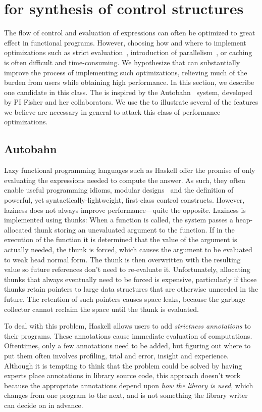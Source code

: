 \section{\rasps for synthesis of control structures}

The flow of control and evaluation of expressions can often be
optimized to great effect in functional programs.  However, choosing
how and where to implement optimizations such as strict
evaluation~\cite{autobahn}, introduction of
parallelism~\cite{implicit-parallel}, or caching is often difficult
and time-consuming.  We hypothesize that \rasps can substantially
improve the process of implementing such optimizations, relieving much
of the burden from \rasp users while obtaining high performance.  In
this section, we describe one candidate \rasp in this class.
The \rasp is inspired by the
Autobahn~\cite{autobahn} system, developed by PI Fisher and her
collaborators.  We use the \rasp to illustrate several of the features
we believe are necessary in general to attack this class of performance
optimizations.

\subsection{Autobahn}

Lazy functional programming languages such as
Haskell offer the promise of only evaluating the expressions needed
to compute the answer. As such, they often enable useful programming
idioms, modular designs~\cite{Hughes89} and the definition of powerful,
yet syntactically-lightweight, first-class control constructs.
However, laziness does not always improve performance---quite the
opposite.  Laziness is implemented using thunks: When a function is called, the
system passes a heap-allocated thunk storing an unevaluated argument to
the function. If in the execution of the function it is determined that
the value of the argument is actually needed, the thunk is forced,
which causes the argument to be evaluated to weak head normal
form. The thunk is then overwritten with the resulting value so future
references don't need to re-evaluate it.  Unfortunately,
allocating thunks that always eventually need to be forced is expensive,
particularly if those thunks retain pointers to large data structures
that are otherwise unneeded in the future.  The retention of such
pointers causes space leaks, because the garbage collector cannot
reclaim the space until the thunk is evaluated.

To deal with this problem, Haskell allows users to add
\emph{strictness annotations} to their programs.  These annotations
cause immediate evaluation of computations. Oftentimes, only a few
annotations need to be added, but figuring out where to put them often
involves profiling, trial and error, insight and experience.  Although
it is tempting to think that the problem could be solved by having
experts place annotations in library source code, this approach
doesn't work because the appropriate annotations depend upon
\textit{how the library is used}, which changes from one program to
the next, and is not something the library writer can decide on in
advance.

